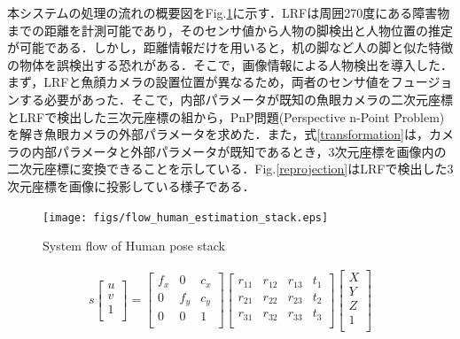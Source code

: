 \documentclass[12pt]{sonota/aislab}
\begin{document}
本システムの処理の流れの概要図をFig.\ref{flow}に示す．LRFは周囲270度にある障害物までの距離を計測可能であり，そのセンサ値から人物の脚検出と人物位置の推定が可能である．しかし，距離情報だけを用いると，机の脚など人の脚と似た特徴の物体を誤検出する恐れがある．そこで，画像情報による人物検出を導入した．まず，LRFと魚顔カメラの設置位置が異なるため，両者のセンサ値をフュージョンする必要があった．そこで，内部パラメータが既知の魚眼カメラの二次元座標とLRFで検出した三次元座標の組から，PnP問題(Perspective n-Point Problem)を解き魚眼カメラの外部パラメータを求めた．また，式\ref{transformation}は，カメラの内部パラメータと外部パラメータが既知であるとき，3次元座標を画像内の二次元座標に変換できることを示している．Fig.\ref{reprojection}はLRFで検出した3次元座標を画像に投影している様子である．

\begin{figure}[t]
\begin{center}
\texttt{[image: figs/flow\_human\_estimation\_stack.eps]}
\caption{System flow of Human pose stack}
\label{flow}
\end{center}
\end{figure}

\begin{eqnarray}
s\left[
\begin{array}{ccc}
u \\
v \\
1 \\
\end{array}
\right]
=
\left[
\begin{array}{ccc}
f_{x} & 0 & c_{x} \\
0 & f_{y} & c_{y} \\
0 & 0 & 1 \\
\end{array}
\right]
\left[
\begin{array}{cccc}
r_{11} & r_{12} & r_{13} & t_{1} \\
r_{21} & r_{22} & r_{23} & t_{2} \\
r_{31} & r_{32} & r_{33} & t_{3} \\
\end{array}
\right]
\left[
\begin{array}{c}
X \\
Y \\
Z \\
1 \\
\end{array}
\right] \label{transformation}
\end{eqnarray}

\end{document}
